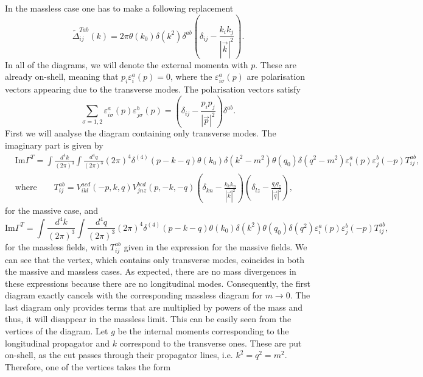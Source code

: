 \documentclass{article}
\begin{document}
In the massless case one has to make a following replacement
\begin{equation*}
    \tilde{\Delta}^{Tab}_{ij}(k)=2\pi\theta(k_0)\delta(k^2)\delta^{ab}\left(\delta_{ij}-\frac{k_ik_j}{|\vec{k}|^2}\right).
\end{equation*}
In all of the diagrams, we will denote the external momenta with $p$. These are already on-shell, meaning that $p_i\varepsilon^a_{i}(p)=0$, where the $\varepsilon^a_{i\sigma}(p)$ are polarisation vectors appearing due to the transverse modes. The polarisation vectors satisfy
\begin{equation*}
    \sum_{\sigma=1,2}\varepsilon^a_{i\sigma}(p)\varepsilon^b_{j\sigma}(p)=\left(\delta_{ij}-\frac{p_ip_j}{|\vec{p}|^2}\right)\delta^{ab}.
\end{equation*}
First we will analyse the diagram containing only transverse modes. The imaginary part is given by
\begin{equation}
\begin{split}
    &\text{Im}\Gamma^T=\int\frac{d^4k}{(2\pi)^3}\int\frac{d^4q}{(2\pi)^3}(2\pi)^4\delta^{(4)}(p-k-q)\theta(k_0)\delta(k^2-m^2)\theta(q_0)\delta(q^2-m^2)\varepsilon^a_{i}(p)\varepsilon_{j}^b(-p)T^{ab}_{ij},\\
    &\text{where}\qquad T^{ab}_{ij}=V^{acd}_{ikl}(-p,k,q)V^{bcd}_{jnz}(p,-k,-q)\left(\delta_{kn}-\frac{k_kk_n}{|\vec{k}|^2}\right)\left(\delta_{lz}-\frac{q_lq_z}{|\vec{q}|^2}\right),
\end{split}
\end{equation}
for the massive case, and 
\begin{equation}
    \text{Im}\Gamma^T=\int\frac{d^4k}{(2\pi)^3}\int\frac{d^4q}{(2\pi)^3}(2\pi)^4\delta^{(4)}(p-k-q)\theta(k_0)\delta(k^2)\theta(q_0)\delta(q^2)\varepsilon^a_{i}(p)\varepsilon_{j}^b(-p)T^{ab}_{ij},
\end{equation}
for the massless fields, with $T^{ab}_{ij}$ given in the expression for the massive fields. 
We can see that the vertex, which contains only transverse modes, coincides in both the massive and massless cases. As expected, there are no mass divergences in these expressions because there are no longitudinal modes.  Consequently, the first diagram exactly cancels with the corresponding massless diagram for $m\to0$. 
\newline
The last diagram only provides terms that are multiplied by powers of the mass and thus, it will disappear in the massless limit. This can be easily seen from the vertices of the diagram. Let $g$ be the internal moments corresponding to the longitudinal propagator and $k$ correspond to the transverse ones. These are put on-shell, as the cut passes through their propagator lines, i.e. $k^2=q^2=m^2$. Therefore, one of the vertices takes the form
\end{document}
